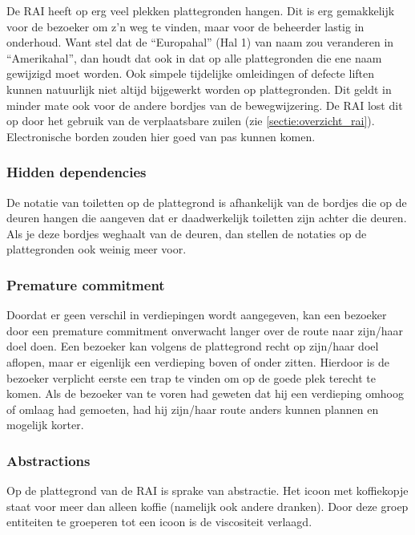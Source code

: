 De RAI heeft op erg veel plekken plattegronden hangen. Dit is erg gemakkelijk voor de bezoeker om z'n weg te vinden, maar voor de beheerder lastig in onderhoud. Want stel dat de ``Europahal'' (Hal 1) van naam zou veranderen in ``Amerikahal'', dan houdt dat ook in dat op alle plattegronden die ene naam gewijzigd moet worden. Ook simpele tijdelijke omleidingen of defecte liften kunnen natuurlijk niet altijd bijgewerkt worden op plattegronden. Dit geldt in minder mate ook voor de andere bordjes van de bewegwijzering. De RAI lost dit op door het gebruik van de verplaatsbare zuilen (zie \ref{sectie:overzicht_rai}). Electronische borden zouden hier goed van pas kunnen komen.


\subsubsection{Hidden dependencies}

De notatie van toiletten op de plattegrond is afhankelijk van de bordjes die op de deuren hangen die aangeven dat er daadwerkelijk toiletten zijn achter die deuren. Als je deze bordjes weghaalt van de deuren, dan stellen de notaties op de plattegronden ook weinig meer voor.


\subsubsection{Premature commitment}

Doordat er geen verschil in verdiepingen wordt aangegeven, kan een bezoeker door een premature commitment onverwacht langer over de route naar zijn/haar doel doen. Een bezoeker kan volgens de plattegrond recht op zijn/haar doel aflopen, maar er eigenlijk een verdieping boven of onder zitten. Hierdoor is de bezoeker verplicht eerste een trap te vinden om op de goede plek terecht te komen. Als de bezoeker van te voren had geweten dat hij een verdieping omhoog of omlaag had gemoeten, had hij zijn/haar route anders kunnen plannen en mogelijk korter.


\subsubsection{Abstractions} \label{sectie:cd_rai_abstractions}

Op de plattegrond van de RAI is sprake van abstractie. Het icoon met koffiekopje staat voor meer dan alleen koffie (namelijk ook andere dranken). Door deze groep entiteiten te groeperen tot een icoon is de viscositeit verlaagd.


